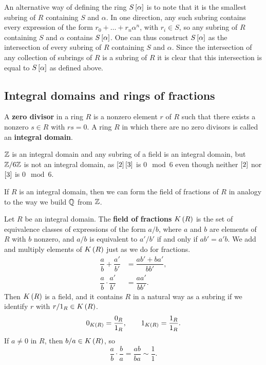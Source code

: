 An alternative way of defining the ring $ S\sbr{\alpha} $ is to note that it is the smallest subring of $ R $ containing $ S $ and $ \alpha $. In one direction, any such subring contains every expression of the form $ r_0 + \dots + r_n\alpha^n $, with $ r_i \in S $, so any subring of $ R $ containing $ S $ and $ \alpha $ contains $ S\sbr{\alpha} $. One can thus construct $ S\sbr{\alpha} $ as the intersection of every subring of $ R $ containing $ S $ and $ \alpha $. Since the intersection of any collection of subrings of $ R $ is a subring of $ R $ it is clear that this intersection is equal to $ S\sbr{\alpha} $ as defined above.

\pagebreak

\subsection{Integral domains and rings of fractions}


\begin{definition}
A \textbf{zero divisor} in a ring $ R $ is a nonzero element $ r $ of $ R $ such that there exists a nonzero $ s \in R $ with $ rs = 0 $. A ring $ R $ in which there are no zero divisors is called an \textbf{integral domain}.
\end{definition}

\begin{example*}
$ \mathbb{Z} $ is an integral domain and any subring of a field is an integral domain, but $ \mathbb{Z} / 6\mathbb{Z} $ is not an integral domain, as $ \sbr{2}\sbr{3} $ is $ 0 \mod 6 $ even though neither $ \sbr{2} $ nor $ \sbr{3} $ is $ 0 \mod 6 $.
\end{example*}

If $ R $ is an integral domain, then we can form the field of fractions of $ R $ in analogy to the way we build $ \mathbb{Q} $ from $ \mathbb{Z} $.

\begin{definition}
Let $ R $ be an integral domain. The \textbf{field of fractions} $ K\br{R} $ is the set of equivalence classes of expressions of the form $ a / b $, where $ a $ and $ b $ are elements of $ R $ with $ b $ nonzero, and $ a / b $ is equivalent to $ a' / b' $ if and only if $ ab' = a'b $. We add and multiply elements of $ K\br{R} $ just as we do for fractions.
\begin{align*}
\dfrac{a}{b} + \dfrac{a'}{b'} & = \dfrac{ab' + ba'}{bb'}, \\
\dfrac{a}{b} \cdot \dfrac{a'}{b'} & = \dfrac{aa'}{bb'}.
\end{align*}
Then $ K\br{R} $ is a field, and it contains $ R $ in a natural way as a subring if we identify $ r $ with $ r / 1_R \in K\br{R} $.
$$ 0_{K\br{R}} = \dfrac{0_R}{1_R}, \qquad 1_{K\br{R}} = \dfrac{1_R}{1_R}. $$
If $ a \ne 0 $ in $ R $, then $ b / a \in K\br{R} $, so
$$ \dfrac{a}{b} \cdot \dfrac{b}{a} = \dfrac{ab}{ba} \sim \dfrac{1}{1}. $$
\end{definition}

